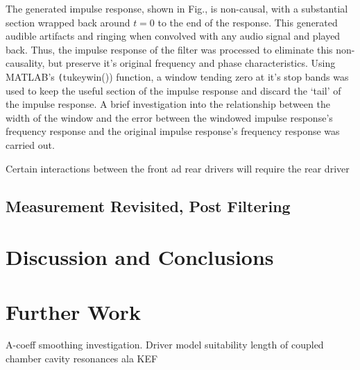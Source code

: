 \documentclass{report}
\begin{document}
            


            The generated impulse response, shown in Fig., is non-causal, with a substantial section wrapped back around $t=0$ to the end of the response.
            This generated audible artifacts and ringing when convolved with any audio signal and played back.
            Thus, the impulse response of the filter was processed to eliminate this non-causality, but preserve it's original frequency and phase characteristics.
            Using MATLAB's \texttt(tukeywin()) function, a window tending zero at it's stop bands was used to keep the useful section of the impulse response and discard the `tail' of the impulse response.
            A brief investigation into the relationship between the width of the window and the error between the windowed impulse response's frequency response and the original impulse response's frequency response was carried out.

            Certain interactions between the front ad rear drivers will require the rear driver



    \section{Measurement Revisited, Post Filtering}


\chapter{Discussion and Conclusions}

\chapter{Further Work}
    A-coeff smoothing investigation.
    Driver model suitability
    length of coupled chamber
    cavity resonances ala KEF



\end{document}
